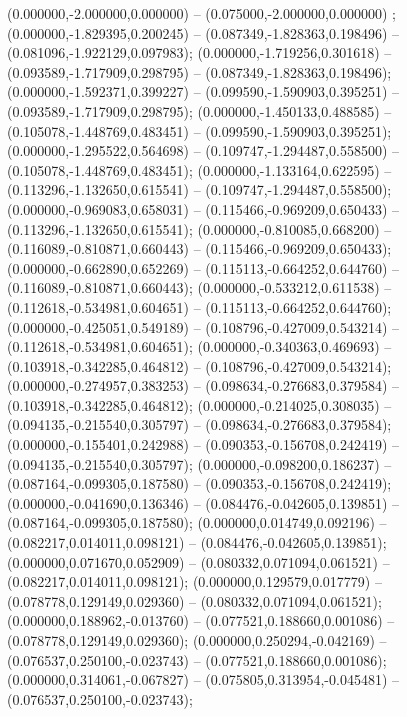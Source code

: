  (0.000000,-2.000000,0.000000) -- (0.075000,-2.000000,0.000000) ;
 (0.000000,-1.829395,0.200245) -- (0.087349,-1.828363,0.198496) -- (0.081096,-1.922129,0.097983);
 (0.000000,-1.719256,0.301618) -- (0.093589,-1.717909,0.298795) -- (0.087349,-1.828363,0.198496);
 (0.000000,-1.592371,0.399227) -- (0.099590,-1.590903,0.395251) -- (0.093589,-1.717909,0.298795);
 (0.000000,-1.450133,0.488585) -- (0.105078,-1.448769,0.483451) -- (0.099590,-1.590903,0.395251);
 (0.000000,-1.295522,0.564698) -- (0.109747,-1.294487,0.558500) -- (0.105078,-1.448769,0.483451);
 (0.000000,-1.133164,0.622595) -- (0.113296,-1.132650,0.615541) -- (0.109747,-1.294487,0.558500);
 (0.000000,-0.969083,0.658031) -- (0.115466,-0.969209,0.650433) -- (0.113296,-1.132650,0.615541);
 (0.000000,-0.810085,0.668200) -- (0.116089,-0.810871,0.660443) -- (0.115466,-0.969209,0.650433);
 (0.000000,-0.662890,0.652269) -- (0.115113,-0.664252,0.644760) -- (0.116089,-0.810871,0.660443);
 (0.000000,-0.533212,0.611538) -- (0.112618,-0.534981,0.604651) -- (0.115113,-0.664252,0.644760);
 (0.000000,-0.425051,0.549189) -- (0.108796,-0.427009,0.543214) -- (0.112618,-0.534981,0.604651);
 (0.000000,-0.340363,0.469693) -- (0.103918,-0.342285,0.464812) -- (0.108796,-0.427009,0.543214);
 (0.000000,-0.274957,0.383253) -- (0.098634,-0.276683,0.379584) -- (0.103918,-0.342285,0.464812);
 (0.000000,-0.214025,0.308035) -- (0.094135,-0.215540,0.305797) -- (0.098634,-0.276683,0.379584);
 (0.000000,-0.155401,0.242988) -- (0.090353,-0.156708,0.242419) -- (0.094135,-0.215540,0.305797);
 (0.000000,-0.098200,0.186237) -- (0.087164,-0.099305,0.187580) -- (0.090353,-0.156708,0.242419);
 (0.000000,-0.041690,0.136346) -- (0.084476,-0.042605,0.139851) -- (0.087164,-0.099305,0.187580);
 (0.000000,0.014749,0.092196) -- (0.082217,0.014011,0.098121) -- (0.084476,-0.042605,0.139851);
 (0.000000,0.071670,0.052909) -- (0.080332,0.071094,0.061521) -- (0.082217,0.014011,0.098121);
 (0.000000,0.129579,0.017779) -- (0.078778,0.129149,0.029360) -- (0.080332,0.071094,0.061521);
 (0.000000,0.188962,-0.013760) -- (0.077521,0.188660,0.001086) -- (0.078778,0.129149,0.029360);
 (0.000000,0.250294,-0.042169) -- (0.076537,0.250100,-0.023743) -- (0.077521,0.188660,0.001086);
 (0.000000,0.314061,-0.067827) -- (0.075805,0.313954,-0.045481) -- (0.076537,0.250100,-0.023743);

